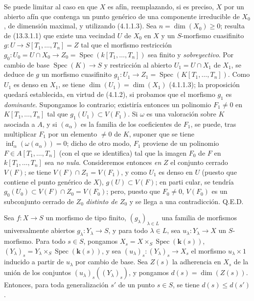 Se puede limitar al caso en que $X$ es afín, reemplazando, si es preciso, $X$ por un
abierto afín que contenga un punto genérico de una componente irreducible de $X_0$,
de dimensión maximal, y utilizando (4.1.1.3). Sea $n=\dim(X_0)\geq 0$; resulta
de (13.3.1.1) que existe una vecindad $U$ de $X_0$ en $X$ y un $S$-morfismo
cuasifinito
$g:U\to S[T_1,\ldots,T_n]=Z$
tal que el morfismo restricción
$g_0:U_0=U\cap X_0\to Z_0=\operatorname{Spec}(k[T_1,\ldots,T_n])$ sea finito y
\emph{sobreyectivo}. Por cambio de base $\operatorname{Spec}(K)\to S$ y restricción
al abierto $U_1=U\cap X_1$ de $X_1$, se deduce de $g$ un morfismo cuasifinito
$g_1:U_1\to Z_1=\operatorname{Spec}(K[T_1,\ldots,T_n])$. Como $U_1$ es denso en
$X_1$, se tiene $\dim(U_1)=\dim(X_1)$ (4.1.1.3); la proposición quedará establecida, en virtud
de (4.1.2), si probamos que el morfismo $g_1$ es \emph{dominante}. Supongamos
lo contrario; existiría entonces un polinomio $F_1\ne 0$ en
$K[T_1,\ldots,T_n]$ tal que $g_1(U_1)\subset V(F_1)$. Si $\omega$ es una valoración
sobre $K$ asociada a $A$, y si $(a_\alpha)$ es la familia de los coeficientes de $F_1$,
se puede, tras multiplicar $F_1$ por un elemento $\ne 0$ de $K$, suponer que
se tiene $\inf_\alpha(\omega(a_\alpha))=0$; dicho de otro modo, $F_1$ proviene de un
polinomio $F\in A[T_1,\ldots,T_n]$ (con el que se identifica) tal que la imagen $F_0$
de $F$ en $k[T_1,\ldots,T_n]$ sea \emph{no nula}. Consideremos entonces \emph{en} $Z$
el conjunto cerrado $V(F)$; se tiene $V(F)\cap Z_1=V(F_1)$, y como $U_1$ es denso
en $U$ (puesto que contiene el punto genérico de $X$), $g(U)\subset V(F)$; en
parti%
cular, se tendría $g_0(U_0)\subset V(F)\cap Z_0=V(F_0)$; pero, puesto que
$F_0\ne 0$, $V(F_0)$ es un subconjunto cerrado de $Z_0$ \emph{distinto de $Z_0$} y
se llega a una contradicción. Q.E.D.


\begin{proposition}[14.3.11]
\label{IV.14.3.11}
Sea $f:X\to S$ un morfismo de tipo finito, $(g_\lambda)_{\lambda\in L}$ una familia de morfismos universalmente abiertos $g_\lambda:Y_\lambda\to S$, y para todo $\lambda\in L$, sea $u_\lambda:Y_\lambda\to X$ un $S$-morfismo.
Para todo $s\in S$, pongamos $X_s=X\times_S\operatorname{Spec}(\boldsymbol{k}(s))$, $(Y_\lambda)_s=Y_\lambda\times_S\operatorname{Spec}(\boldsymbol{k}(s))$, y sea $(u_\lambda)_s:(Y_\lambda)_s\to X_s$ el morfismo $u_\lambda\times 1$ inducido a partir de $u_\lambda$ por cambio de base.
Sea $Z(s)$ la adherencia en $X_s$ de la unión de los conjuntos $(u_\lambda)_s((Y_\lambda)_s)$, y pongamos $d(s)=\dim(Z(s))$.
Entonces, para toda generalización $s'$ de un punto $s\in S$, se tiene $d(s)\leq d(s')$.
\end{proposition}

